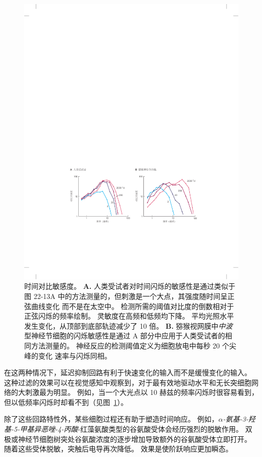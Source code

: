 \begin{figure}[htbp]
	\centering
	\includegraphics[width=1.0\linewidth]{chap22/fig_22_14}
	\caption{时间对比敏感度。
		\textbf{A.} 人类受试者对时间闪烁的敏感性是通过类似于图 22-13A 中的方法测量的，但刺激是一个大点，其强度随时间呈正弦曲线变化 而不是在太空中。 
		检测所需的阈值对比度的倒数相对于正弦闪烁的频率绘制。 
		灵敏度在高频和低频均下降。 
		平均光照水平发生变化，从顶部到底部轨迹减少了 10 倍。
		\textbf{B.} 猕猴视网膜中\textit{中波}型神经节细胞的闪烁敏感性是通过 A 部分中应用于人类受试者的相同方法测量的。
		神经反应的检测阈值定义为细胞放电中每秒 20 个尖峰的变化 速率与闪烁同相。}
	\label{fig:22_14}
\end{figure}


在这两种情况下，延迟抑制回路有利于快速变化的输入而不是缓慢变化的输入。
这种过滤的效果可以在视觉感知中观察到，对于最有效地驱动水平和无长突细胞网络的大刺激最为明显。
例如，当一个大光点以 10 赫兹的频率闪烁时很容易看到，但以低频率闪烁时却看不到（见图~\ref{fig:22_14}）。


除了这些回路特性外，某些细胞过程还有助于塑造时间响应。
例如，\textit{$\alpha$-氨基-3-羟基-5-甲基异恶唑-4-丙酸}-红藻氨酸类型的谷氨酸受体会经历强烈的脱敏作用。
双极或神经节细胞树突处谷氨酸浓度的逐步增加导致额外的谷氨酸受体立即打开。
随着这些受体脱敏，突触后电导再次降低。
效果是使阶跃响应更加瞬态。


